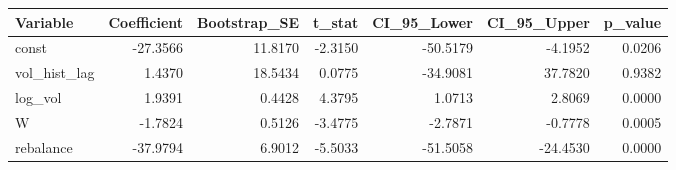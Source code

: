 \begin{tabular}{lrrrrrr}
\toprule
Variable & Coefficient & Bootstrap_SE & t_stat & CI_95_Lower & CI_95_Upper & p_value \\
\midrule
const & -27.3566 & 11.8170 & -2.3150 & -50.5179 & -4.1952 & 0.0206 \\
vol_hist_lag & 1.4370 & 18.5434 & 0.0775 & -34.9081 & 37.7820 & 0.9382 \\
log_vol & 1.9391 & 0.4428 & 4.3795 & 1.0713 & 2.8069 & 0.0000 \\
W & -1.7824 & 0.5126 & -3.4775 & -2.7871 & -0.7778 & 0.0005 \\
rebalance & -37.9794 & 6.9012 & -5.5033 & -51.5058 & -24.4530 & 0.0000 \\
\bottomrule
\end{tabular}
